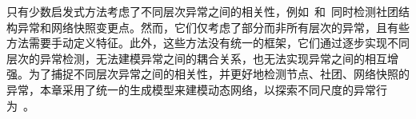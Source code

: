 
只有少数启发式方法考虑了不同层次异常之间的相关性，例如~\cite{hulovatyy2016scout}和~\cite{cheung2020simultaneous}同时检测社团结构异常和网络快照变更点。然而，它们仅考虑了部分而非所有层次的异常，且有些方法需要手动定义特征。此外，这些方法没有统一的框架，它们通过逐步实现不同层次的异常检测，无法建模异常之间的耦合关系，也无法实现异常之间的相互增强。为了捕捉不同层次异常之间的相关性，并更好地检测节点、社团、网络快照的异常，本章采用了统一的生成模型来建模动态网络，以探索不同尺度的异常行为~\cite{wang2019nodes,cheng2008robust,darst2016detection}。 

